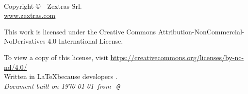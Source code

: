 
\newpage
~\vfill
\thispagestyle{empty}

Copyright \copyright\ \the\year\ Zextras Srl.\\ %

\url{www.zextras.com}\\ %

\ccbyncsa{}

This work is licensed under the Creative Commons Attribution-NonCommercial-NoDerivatives 4.0 International License.

To view a copy of this license, visit \url{https://creativecommons.org/licenses/by-nc-nd/4.0/}\\

Written in \LaTeX because developers \ExcuseToUseLatex.\\

\textit{Document built on \today\ from \texttt{\branchName\ @\href{https://github.com/ZeXtras/OpenChat/tree/\commitId}{\shortCommitId}}} %
